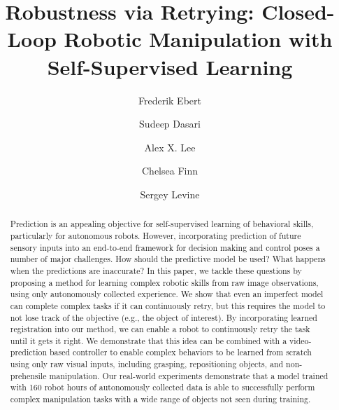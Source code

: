 \documentclass{article}
\title{Robustness via Retrying: Closed-Loop Robotic Manipulation with Self-Supervised Learning}
\author[1]{Frederik Ebert}
\author[1]{Sudeep Dasari}
\author[1]{Alex X. Lee}
\author[1]{Chelsea Finn}
\author[1]{Sergey Levine}
\affil[1]{\footnotesize Department of Electrical Engineering and Computer Sciences, UC Berkeley, United States}
\affil[ ]{\texttt{\{febert,sdasari,alexlee\_gk,cbfinn,svlevine\}@berkeley.edu}}
\begin{document}

\maketitle

\begin{abstract}
Prediction is an appealing objective for self-supervised learning of behavioral skills, particularly for autonomous robots. However, incorporating prediction of future sensory inputs into an end-to-end framework for decision making and control poses a number of major challenges. How should the predictive model be used? What happens when the predictions are inaccurate? In this paper, we tackle these questions by proposing a method for learning complex robotic skills from raw image observations, using only autonomously collected experience. We show that even an imperfect model can complete complex tasks if it can continuously retry, but this requires the model to not lose track of the objective (e.g., the object of interest). By incorporating  learned registration into our method, we can enable a robot to continuously retry the task until it gets it right. We demonstrate that this idea can be combined with a video-prediction based controller to enable complex behaviors to be learned from scratch using only raw visual inputs, including grasping, repositioning objects, and non-prehensile manipulation. Our real-world experiments demonstrate that a model trained with 160 robot hours of autonomously collected data is able to successfully perform complex manipulation tasks with a wide range of objects not seen during training.

\end{abstract}
\end{document}
